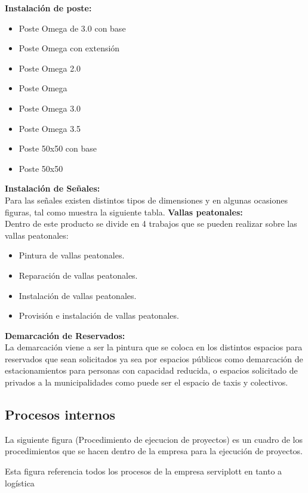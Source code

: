 	\textbf{Instalación de poste: }\\
	\begin{itemize}
	\item Poste Omega de 3.0 con base
	\item Poste Omega con extensión
	\item Poste Omega 2.0
	\item Poste Omega
	\item Poste Omega 3.0
	\item Poste Omega 3.5
	\item Poste 50x50 con base
	\item Poste 50x50
	\end{itemize}
	\textbf{Instalación de Señales:}\\
	Para las señales existen distintos tipos de dimensiones y en algunas ocasiones figuras, tal como muestra la siguiente tabla.
	\textbf{Vallas peatonales: }\\
	Dentro de este producto se divide en 4 trabajos que se pueden realizar sobre las vallas peatonales:
	\begin{itemize}
	\item Pintura de vallas peatonales.
	\item Reparación de vallas peatonales.
	\item Instalación de vallas peatonales.
	\item Provisión e instalación de vallas peatonales.
	\end{itemize}

\textbf{Demarcación de Reservados: }\\
	La demarcación viene a ser la pintura que se coloca en los distintos espacios para reservados que sean solicitados ya sea por espacios públicos como demarcación de estacionamientos para personas con capacidad reducida, o espacios solicitado de privados a la municipalidades como puede ser el espacio de taxis y colectivos.
    \subsection{Procesos internos}
    La siguiente figura (Procedimiento de ejecucion de proyectos) es un cuadro de los procedimientos que se hacen dentro de la empresa para la ejecución de proyectos.
    
    
    Esta figura referencia todos los procesos de la empresa serviplott en tanto a logística

